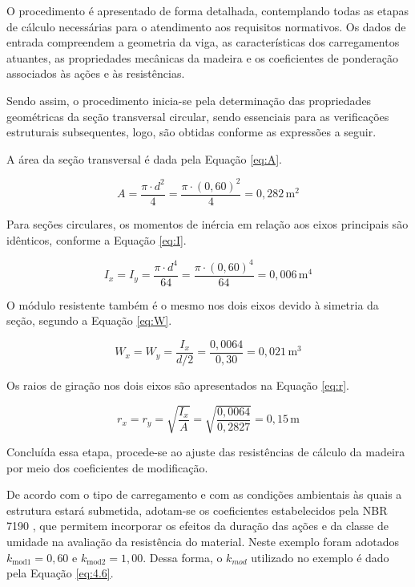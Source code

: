 O procedimento é apresentado de forma detalhada, contemplando todas as etapas de cálculo necessárias para o atendimento aos requisitos normativos. Os dados de entrada compreendem a geometria da viga, as características dos carregamentos atuantes, as propriedades mecânicas da madeira e os coeficientes de ponderação associados às ações e às resistências. 

Sendo assim, o procedimento inicia-se pela determinação das propriedades geométricas da seção transversal circular, sendo essenciais para as verificações estruturais subsequentes, logo, são obtidas conforme as expressões a seguir.

A área da seção transversal é dada pela Equação \eqref{eq:A}.

\begin{equation}
A = \frac{\pi \cdot d^2}{4}
  = \frac{\pi \cdot (0{,}60)^2}{4}
  = 0{,}282\, \text{m}^2
  \label{eq:A}
\end{equation}

Para seções circulares, os momentos de inércia em relação aos eixos principais são idênticos, conforme a Equação \eqref{eq:I}.

\begin{equation}
I_x = I_y = \frac{\pi \cdot d^4}{64}
          = \frac{\pi \cdot (0{,}60)^4}{64}
          = 0{,}006\,\text{m}^4
\label{eq:I}
\end{equation}

O módulo resistente também é o mesmo nos dois eixos devido à simetria da seção, segundo a Equação \eqref{eq:W}.

\begin{equation}
W_x = W_y = \frac{I_x}{d/2}
          = \frac{0{,}0064}{0{,}30}
          = 0{,}021\,\text{m}^3
\label{eq:W}
\end{equation}

Os raios de giração nos dois eixos são apresentados na Equação \eqref{eq:r}.

\begin{equation}
r_x = r_y = \sqrt{\frac{I_x}{A}}
          = \sqrt{\frac{0{,}0064}{0{,}2827}}
          = 0{,}15\,\text{m}
\label{eq:r}
\end{equation}

Concluída essa etapa, procede-se ao ajuste das resistências de cálculo da madeira por meio dos coeficientes de modificação.

De acordo com o tipo de carregamento e com as condições ambientais às quais a estrutura estará submetida, adotam-se os coeficientes estabelecidos pela NBR 7190 \cite{NBR7190-1:2022}, que permitem incorporar os efeitos da duração das ações e da classe de umidade na avaliação da resistência do material. Neste exemplo foram adotados $k_{\text{mod1}} = 0{,}60$ e $k_{\text{mod2}} = 1{,}00$. Dessa forma, o $k_{mod}$ utilizado no exemplo é dado pela Equação \eqref{eq:4.6}.

